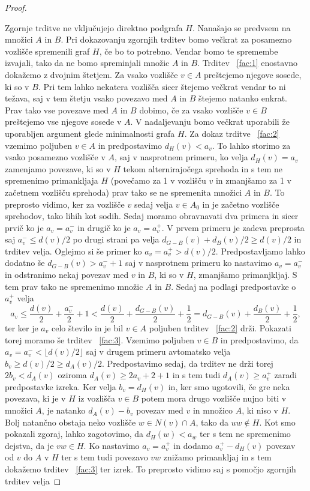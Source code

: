 \documentclass[12pt,a4paper,twoside]{article}
\theoremstyle{definition} %
\theoremstyle{plain} %
\numberwithin{equation}{section}  %
\begin{document}
\begin{proof}
\begin{enumerate}
\end{enumerate}
Zgornje trditve ne vključujejo direktno podgrafa $H$. Nanašajo se predvsem na množici $A$ in $B$. Pri dokazovanju zgornjih trditev bomo večkrat za posamezno vozlišče spremenili graf $H$, če bo to potrebno. Vendar bomo te spremembe izvajali, tako da ne bomo spreminjali množic $A$ in $B$.
Trditev ~\ref{fac:1} enostavno dokažemo z dvojnim štetjem. Za vsako vozlišče $v \in A$ preštejemo njegove sosede, ki so v $B$. Pri tem lahko nekatera vozlišča sicer štejemo večkrat vendar to ni težava, saj v tem štetju vsako povezavo med $A$ in $B$ štejemo natanko enkrat. Prav tako vse povezave med $A$ in $B$ dobimo, če za vsako vozlišče $v \in B$ preštejemo vse njegove sosede v $A$. V nadaljevanju bomo večkrat uporabili že uporabljen argument glede minimalnosti grafa $H$.
Za dokaz trditve ~\ref{fac:2} vzemimo poljuben $v \in A$ in predpostavimo $d_H(v) < a_v$. To lahko storimo za vsako posamezno vozlišče v $A$, saj v nasprotnem primeru, ko velja $d_H(v) = a_v$ zamenjamo povezave, ki so v $H$ tekom alternirajočega sprehoda in s tem ne spremenimo primankljaja $H$ (povečamo za 1 v vozlišču $v$ in zmanjšamo za 1 v začetnem vozlišču sprehoda) prav tako se ne spremenita množici $A$ in $B$. To preprosto vidimo, ker za vozlišče $v$ sedaj velja $v \in A_0$ in je začetno vozlišče sprehodov, tako lihih kot sodih. Sedaj moramo obravnavati dva primera in sicer prvič ko je $a_v = a_v^-$ in drugič ko je $a_v = a_v^+$. V prvem primeru je zadeva preprosta saj $a_v^- \le d(v)/2$ po drugi strani pa velja $d_{G-B}(v) + d_B(v)/2 \ge d(v)/2$ in trditev velja. Oglejmo si še primer ko $a_v = a_v^+ > d(v)/2$. Predpostavljamo lahko dodatno še $d_ {G-B}(v) > a_v^- + 1$ saj v nasprotnem primeru ko nastavimo $a_v = a_v^-$ in odstranimo nekaj povezav med $v$ in $B$, ki so v $H$, zmanjšamo primanjkljaj. S tem prav tako ne spremenimo množic $A$ in $B$. Sedaj na podlagi predpostavke o $a_v^+$ velja
$$a_v \le \frac{d(v)}{2} + \frac{a_v^-}{2} + 1 < \frac{d(v)}{2} + \frac{d_{G-B}(v)}{2} + \frac{1}{2} = d_{G-B}(v) + \frac{d_B(v)}{2} + \frac{1}{2}, $$
ter ker je $a_v$ celo število in je bil $v \in A$ poljuben trditev ~\ref{fac:2} drži. Pokazati torej moramo še trditev ~\ref{fac:3}. Vzemimo poljuben $v \in B$ in predpostavimo, da $a_v = a_v^- < \lfloor d(v)/2 \rfloor$ saj v drugem primeru avtomatsko velja $b_v \ge d(v)/2 \ge d_A(v)/2$. Predpostavimo sedaj, da trditev ne drži torej $2b_v < d_A(v)$ oziroma $d_A(v) \ge 2a_v + 2 + 1$ in s tem tudi $d_A(v) \ge a_v^+$ zaradi predpostavke izreka. Ker velja $b_v = d_H(v)$ in, ker smo ugotovili, če gre neka povezava, ki je v $H$ iz vozlišča $v \in B$ potem mora drugo vozlišče nujno biti v množici $A$, je natanko $d_A(v) - b_v$ povezav med $v$ in množico $A$, ki niso v $H$. Bolj natančno obstaja neko vozlišče $w \in N(v) \cap A$, tako da $uw \notin H$. Kot smo pokazali zgoraj, lahko zagotovimo, da $d_H(w) < a_w$ ter s tem ne spremenimo dejstva, da je $vw \in H$. Ko nastavimo $a_v = a_v^+$ in dodamo $a_v^+ - d_H(v)$ povezav od $v$ do $A$ v $H$ ter s tem tudi povezavo $vw$ znižamo primankljaj in s tem dokažemo trditev ~\ref{fac:3} ter izrek. To preprosto vidimo saj s pomočjo zgornjih trditev velja

\end{proof}
\end{document}
